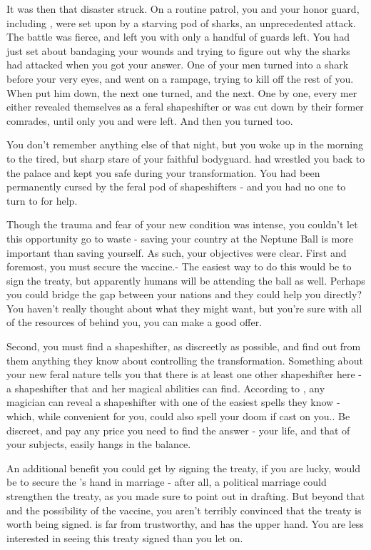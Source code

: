 \documentclass[char]{NeptuneBall}
\begin{document}
It was then that disaster struck. On a routine patrol, you and your honor guard, including \cBodyguard{}, were set upon by a starving pod of sharks, an unprecedented attack. The battle was fierce, and left you with only a handful of guards left. You had just set about bandaging your wounds and trying to figure out why the sharks had attacked when you got your answer. One of your men turned into a shark before your very eyes, and went on a rampage, trying to kill off the rest of you. When \cBodyguard{} put him down, the next one turned, and the next. One by one, every mer either revealed themselves as a feral shapeshifter or was cut down by their former comrades, until only you and \cBodyguard{} were left. And then you turned too.

You don't remember anything else of that night, but you woke up in the morning to the tired, but sharp stare of your faithful bodyguard. \cBodyguard{\They} had wrestled you back to the palace and kept you safe during your transformation. You had been permanently cursed by the feral pod of shapeshifters - and you had no one to turn to for help.

Though the trauma and fear of your new condition was intense, you couldn't let this opportunity go to waste - saving your country at the Neptune Ball is more important than saving yourself. As such, your objectives were clear. First and foremost, you must secure the \ppolio{} vaccine.- The easiest way to do this would be to sign the treaty, but apparently humans will be attending the ball as well. Perhaps you could bridge the gap between your nations and they could help you directly? You haven't really thought about what they might want, but you're sure with all of the resources of \pPacifica{} behind you, you can make a good offer. 

Second, you must find a shapeshifter, as discreetly as possible, and find out from them anything they know about controlling the transformation. Something about your new feral nature tells you that there is at least one other shapeshifter here - a shapeshifter that \cBodyguard{} and her magical abilities can find. According to \cBodyguard{}, any magician can reveal a shapeshifter with one of the easiest spells they know - which, while convenient for you, could also spell your doom if cast on you.. Be discreet, and pay any price you need to find the answer - your life, and that of your subjects, easily hangs in the balance.

An additional benefit you could get by signing the treaty, if you are lucky, would be to secure the \cPrincess{\prince}'s hand in marriage - after all, a political marriage could strengthen the treaty, as you made sure to point out in drafting. But beyond that and the possibility of the vaccine, you aren't terribly convinced that the treaty is worth being signed. \pAtlantis{} is far from trustworthy, and \pPacifica{} has the upper hand. You are less interested in seeing this treaty signed than you let on.
\end{document}
